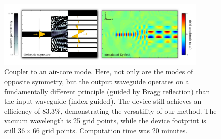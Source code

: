 \documentclass[letterpaper,10pt]{article}
\begin{document}
\begin{figure}[htbp]
    \centering
    \includegraphics[width=0.9\textwidth]{fig/air-core.jpg}
    \caption{Coupler to an air-core mode.
        Here, not only are the modes of opposite symmetry,
        but the output waveguide operates on a fundamentally different
        principle (guided by Bragg reflection) than the input waveguide 
        (index guided).
        The device still achieves an efficiency of $83.3\%$, demonstrating the
        versatility of our method.
        The vacuum wavelength is 25 grid points, 
        while the device footprint is still $36 \times 66$ grid points.
        Computation time was 20 minutes.
        }
\end{figure}
\end{document}
